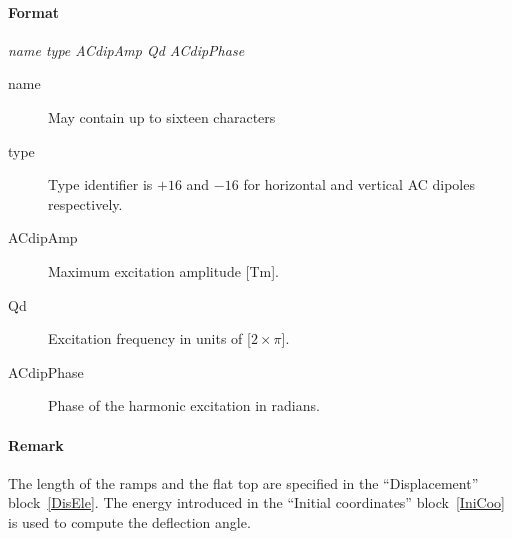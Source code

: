 \documentclass[a4paper,11pt]{report}
\begin{document}
\paragraph{Format} {\em name type ACdipAmp Qd ACdipPhase}
\begin{description}
\item [name] May contain up to sixteen characters
\item [type] Type identifier is $+16$ and $-16$ for horizontal and vertical
  AC dipoles respectively.
\item [ACdipAmp] Maximum excitation amplitude [Tm].
\item [Qd] Excitation frequency in units of [$2 \times \pi$]. 
\item [ACdipPhase] Phase of the harmonic excitation in radians.
\end{description}

\paragraph{Remark}
The length of the ramps and the flat top are specified in the
``Displacement'' block~\ref{DisEle}. The energy introduced in the
``Initial coordinates'' block~\ref{IniCoo} is used to compute the 
deflection angle.



\end{document}
